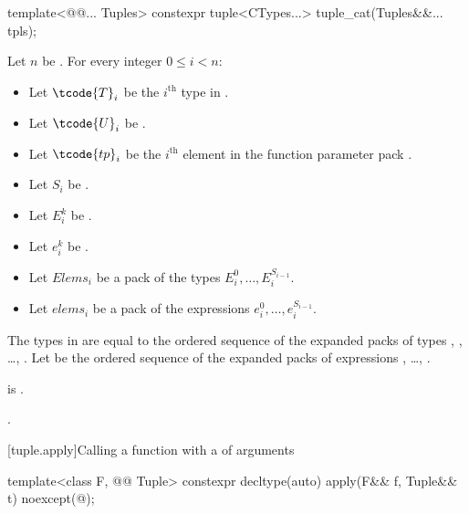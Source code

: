 \begin{itemdecl}
template<@@... Tuples>
  constexpr tuple<CTypes...> tuple_cat(Tuples&&... tpls);
\end{itemdecl}

\begin{itemdescr}
\pnum
Let $n$ be .
For every integer $0 \leq i < n$:
\begin{itemize}
\item
Let $\tcode{T}_i$ be the $i^\text{th}$ type in .
\item
Let $\tcode{U}_i$ be .
\item
Let $\tcode{tp}_i$ be the $i^\text{th}$ element
in the function parameter pack .
\item
Let $S_i$ be .
\item
Let $E_i^k$ be .
\item
Let $e_i^k$ be .
\item
Let $Elems_i$ be a pack of the types $E_i^0, \dotsc, E_i^{S_{i-1}}$.
\item
Let $elems_i$ be a pack of the expressions $e_i^0, \dotsc, e_i^{S_{i-1}}$.
\end{itemize}
The types in  are equal to the ordered sequence of
the expanded packs of types
, , \ldots, .
Let  be the ordered sequence of
the expanded packs of expressions
, \ldots, .

\pnum
\mandates
{} is .

\pnum
\returns
{}.
\end{itemdescr}

[tuple.apply]{Calling a function with a  of arguments}

%
\begin{itemdecl}
template<class F, @@ Tuple>
  constexpr decltype(auto) apply(F&& f, Tuple&& t) noexcept(@\seebelow@);
\end{itemdecl}

